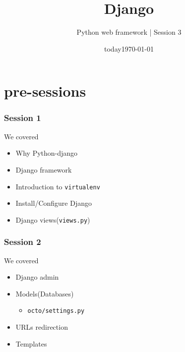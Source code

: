 \documentclass[bigger, presentation]{beamer}
\date{today}
\subtitle{Python web framework | Session 3}
\institute{Indian Institute of Technology Bombay}
\title{Django}
\author{}
\date{\today}
\begin{document}
\maketitle

\section{pre-sessions}
\label{sec-1}
\begin{frame}
\frametitle{Session 1}
\label{sec-1-1}

   We covered
   
\begin{itemize}
\item Why Python-django
\item Django framework
\item Introduction to \texttt{virtualenv}
\item Install/Configure Django
\item Django views(\texttt{views.py})
\end{itemize}
\end{frame}
\begin{frame}
\frametitle{Session 2}
\label{sec-1-2}

   
   We covered

\begin{itemize}
\item Django admin
\item Models(Databases)
\begin{itemize}
\item \texttt{octo/settings.py}
\end{itemize}
\item URLs redirection
\item Templates
\end{itemize}
\end{frame}
\end{document}
